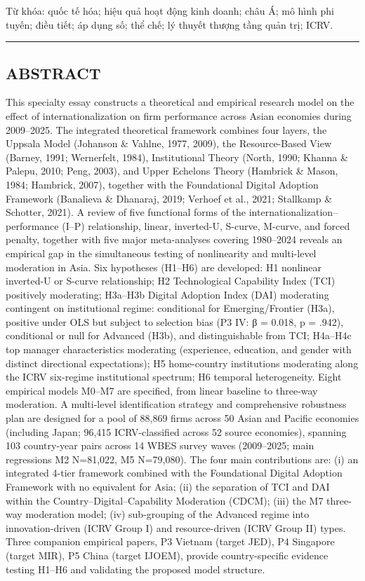 \documentclass[
  a4paper,
  13pt]{extreport}
\begin{document}
Từ khóa: quốc tế hóa; hiệu quả hoạt động kinh doanh; châu Á; mô hình phi
tuyến; điều tiết; áp dụng số; thể chế; lý thuyết thượng tầng quản trị;
ICRV.

\begin{center}\rule{0.5\linewidth}{0.5pt}\end{center}

\hypertarget{abstract}{%
\subsection{ABSTRACT}\label{abstract}}

This specialty essay constructs a theoretical and empirical research
model on the effect of internationalization on firm performance across
Asian economies during 2009--2025. The integrated theoretical framework
combines four layers, the Uppsala Model (Johanson \& Vahlne, 1977,
2009), the Resource-Based View (Barney, 1991; Wernerfelt, 1984),
Institutional Theory (North, 1990; Khanna \& Palepu, 2010; Peng, 2003),
and Upper Echelons Theory (Hambrick \& Mason, 1984; Hambrick, 2007),
together with the Foundational Digital Adoption Framework (Banalieva \&
Dhanaraj, 2019; Verhoef et al., 2021; Stallkamp \& Schotter, 2021). A
review of five functional forms of the internationalization--performance
(I--P) relationship, linear, inverted-U, S-curve, M-curve, and forced
penalty, together with five major meta-analyses covering 1980--2024
reveals an empirical gap in the simultaneous testing of nonlinearity and
multi-level moderation in Asia. Six hypotheses (H1--H6) are developed:
H1 nonlinear inverted-U or S-curve relationship; H2 Technological
Capability Index (TCI) positively moderating; H3a--H3b Digital Adoption
Index (DAI) moderating contingent on institutional regime: conditional
for Emerging/Frontier (H3a), positive under OLS but subject to selection
bias (P3 IV: β = 0.018, p = .942), conditional or null for Advanced
(H3b), and distinguishable from TCI; H4a--H4c top manager
characteristics moderating (experience, education, and gender with
distinct directional expectations); H5 home-country institutions
moderating along the ICRV six-regime institutional spectrum; H6 temporal
heterogeneity. Eight empirical models M0--M7 are specified, from linear
baseline to three-way moderation. A multi-level identification strategy
and comprehensive robustness plan are designed for a pool of 88,869
firms across 50 Asian and Pacific economies (including Japan; 96,415
ICRV-classified across 52 source economies), spanning 103 country-year
pairs across 14 WBES survey waves (2009--2025; main regressions M2
N=81,022, M5 N=79,080). The four main contributions are: (i) an
integrated 4-tier framework combined with the Foundational Digital
Adoption Framework with no equivalent for Asia; (ii) the separation of
TCI and DAI within the Country--Digital--Capability Moderation (CDCM);
(iii) the M7 three-way moderation model; (iv) sub-grouping of the
Advanced regime into innovation-driven (ICRV Group I) and
resource-driven (ICRV Group II) types. Three companion empirical papers,
P3 Vietnam (target JED), P4 Singapore (target MIR), P5 China (target
IJOEM), provide country-specific evidence testing H1--H6 and validating
the proposed model structure.
\end{document}
